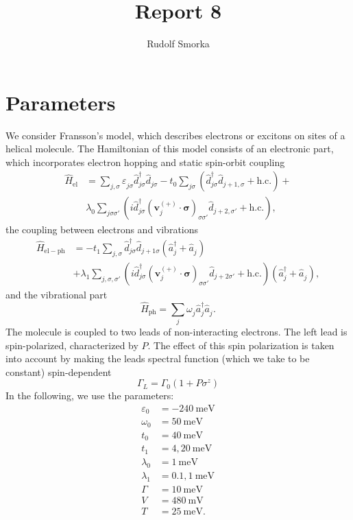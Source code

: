 \documentclass{article}
\renewcommand{\vec}[1]{\mathbf{#1}}
\newcommand{\pdagger}{{\phantom{\dagger}}}
\begin{document}
\title{Report 8}
\author{Rudolf Smorka}
\maketitle
\section{Parameters}
We consider Fransson's model, which describes electrons or excitons on sites of a helical molecule. The Hamiltonian of this model consists of an electronic part, which incorporates electron hopping and static spin-orbit coupling 
\begin{equation}
	\begin{split}
		\hat{H}_\mathrm{el} &= \sum_{j,\sigma} \varepsilon_{j\sigma}^\pdagger \hat{d}_{j\sigma}^\dagger \hat{d}_{j\sigma}^\pdagger - t_0 \sum_{j\sigma} (\hat{d}_{j\sigma}^\dagger \hat{d}_{j+1,\sigma}^\pdagger + \mathrm{h.c.}) +\\& \lambda_0^\pdagger\sum_{j\sigma\sigma'} (i\hat{d}_{j\sigma}^\dagger (\vec{v}_j^{(+)}\cdot \bm{\sigma})_{\sigma\sigma'}^\pdagger \hat{d}_{j+2,\sigma'}^\pdagger + \mathrm{h.c.}),
	\end{split}
\end{equation}
the coupling between electrons and vibrations
\begin{align}
	\hat{H}_\mathrm{el-ph} &= - t_1^\pdagger \sum_{j,\sigma}  \hat{d}_{j\sigma}^\dagger \hat{d}_{j+1\sigma}^\pdagger (\hat{a}_{j}^\dagger + \hat{a}_{j}^\pdagger) \\ & + \lambda_1^\pdagger\sum_{j,\sigma,\sigma'} (i \hat{d}_{j\sigma}^\dagger (\vec{v}_j^{(+)} \cdot \bm{\sigma})_{\sigma\sigma'}^\pdagger \hat{d}_{j+2\sigma'}^\pdagger +\mathrm{h.c.})(\hat{a}_{j}^\dagger + \hat{a}_{j}^\pdagger),\label{eq:HelPh}
\end{align}
and the vibrational part
\begin{equation}
	\hat{H}_\mathrm{ph} = \sum_{j} \omega_{j}^\pdagger \hat{a}_{j}^\dagger \hat{a}_{j}^\pdagger.
	\label{eq:HPh} 
\end{equation}
The molecule is coupled to two leads of non-interacting electrons. The left lead is spin-polarized, characterized by $P$. The effect of this spin polarization is taken into account by making the leads spectral function (which we take to be constant) spin-dependent
\begin{equation}
	\Gamma_L= \Gamma_0 (1+P\sigma^z)
\end{equation}
In the following, we use the parameters:
\begin{align*}
	\varepsilon_0 &= -\SI{240}{\milli\electronvolt}\\
	\omega_0 &= \SI{50}{\milli\electronvolt}\\
	t_0 &= \SI{40}{\milli\electronvolt}\\
	t_1 &= 4,\SI{20}{\milli\electronvolt}\\
	\lambda_0 &= \SI{1}{\milli\electronvolt}\\
	\lambda_1 &= 0.1,\SI{1}{\milli\electronvolt}\\
	\Gamma &= \SI{10}{\milli\electronvolt}\\
	V 	&= \SI{480}{\milli\volt}\\
	T &= \SI{25}{\milli\electronvolt}.
\end{align*}
\end{document}
